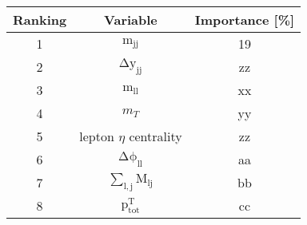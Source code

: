 \vspace{0.3cm}
\begin{tabular}{ c | c  | c }
\hline
\hline
Ranking & Variable & Importance [\%]\\
\hline
1       & $\mathrm{m_{jj}}$            & 19\\
2       & $\mathrm {\Delta y_{jj}}$    & zz\\
3       & $\mathrm {m_{ll}}$           & xx\\
4       & $m_T$                        & yy\\
5       & lepton $\eta$ centrality     & zz\\
6       & $\mathrm{\Delta \phi_{ll}}$  & aa\\
7       & $\mathrm{\sum_{l,j} M_{lj}}$ & bb \\
8       & $\mathrm{p^{T}_{tot}}$       & cc \\
\hline
\hline
\end{tabular}
